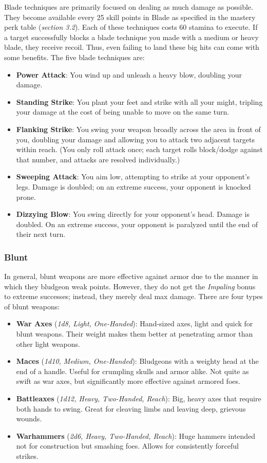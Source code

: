 Blade techniques are primarily focused on dealing as much damage as possible. They become available every 25 skill points in Blade as specified in the mastery perk table (\textit{section 3.2}). Each of these techniques costs 60 stamina to execute. If a target successfully blocks a blade technique you made with a medium or heavy blade, they receive recoil. Thus, even failing to land these big hits can come with some benefits. The five blade techniques are:

\begin{itemize}
	\item \textbf{Power Attack}: You wind up and unleash a heavy blow, doubling your damage.
	\item \textbf{Standing Strike}: You plant your feet and strike with all your might, tripling your damage at the cost of being unable to move on the same turn.
	\item \textbf{Flanking Strike}: You swing your weapon broadly across the area in front of you, doubling your damage and allowing you to attack two adjacent targets within reach. (You only roll attack once; each target rolls block/dodge against that number, and attacks are resolved individually.)
	\item \textbf{Sweeping Attack}: You aim low, attempting to strike at your opponent's legs. Damage is doubled; on an extreme success, your opponent is knocked prone.
	\item \textbf{Dizzying Blow}: You swing directly for your opponent's head. Damage is doubled. On an extreme success, your opponent is paralyzed until the end of their next turn.
\end{itemize}

\subsubsection{Blunt}

In general, blunt weapons are more effective against armor due to the manner in which they bludgeon weak points. However, they do not get the \textit{Impaling} bonus to extreme successes; instead, they merely deal max damage. There are four types of blunt weapons:

\begin{itemize}
	\item \textbf{War Axes} (\textit{1d8, Light, One-Handed}): Hand-sized axes, light and quick for blunt weapons. Their weight makes them better at penetrating armor than other light weapons.
	\item \textbf{Maces} (\textit{1d10, Medium, One-Handed}): Bludgeons with a weighty head at the end of a handle. Useful for crumpling skulls and armor alike. Not quite as swift as war axes, but significantly more effective against armored foes.
	\item \textbf{Battleaxes} (\textit{1d12, Heavy, Two-Handed, Reach}): Big, heavy axes that require both hands to swing. Great for cleaving limbs and leaving deep,  grievous wounds.
	\item \textbf{Warhammers} (\textit{2d6, Heavy, Two-Handed, Reach}): Huge hammers intended not for construction but smashing foes. Allows for consistently forceful strikes.
\end{itemize}

